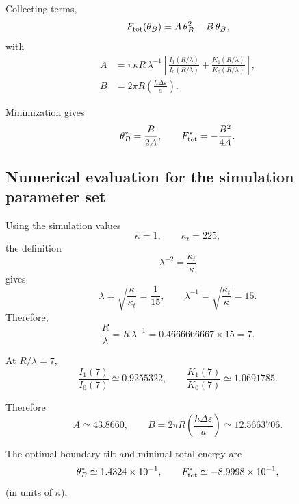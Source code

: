 \documentclass[11pt]{article}
\begin{document}
Collecting terms,
\begin{equation}
F_{\rm tot}(\theta_B)=A\,\theta_B^2 - B\,\theta_B,
\end{equation}
with
\begin{align}
A &= \pi\kappa R\,\lambda^{-1}
\left[
\frac{I_1(R/\lambda)}{I_0(R/\lambda)}
+
\frac{K_1(R/\lambda)}{K_0(R/\lambda)}
\right],
\\
B &= 2\pi R\left(\frac{h\Delta\varepsilon}{a}\right).
\end{align}

Minimization gives
\begin{equation}
\theta_B^\ast=\frac{B}{2A},
\qquad
F_{\rm tot}^\ast=-\frac{B^2}{4A}.
\end{equation}

\subsection{Numerical evaluation for the simulation parameter set}

Using the simulation values
\begin{equation}
\kappa = 1, \qquad
\kappa_t = 225,
\end{equation}
the definition
\begin{equation}
\lambda^{-2} = \frac{\kappa_t}{\kappa}
\end{equation}
gives
\begin{equation}
\lambda = \sqrt{\frac{\kappa}{\kappa_t}} = \frac{1}{15},
\qquad
\lambda^{-1} = \sqrt{\frac{\kappa_t}{\kappa}} = 15.
\end{equation}
Therefore,
\begin{equation}
\frac{R}{\lambda} = R\,\lambda^{-1}
= 0.4666666667 \times 15 = 7.
\end{equation}

At $R/\lambda = 7$,
\begin{equation}
\frac{I_1(7)}{I_0(7)} \simeq 0.9255322,
\qquad
\frac{K_1(7)}{K_0(7)} \simeq 1.0691785.
\end{equation}

Therefore
\begin{equation}
A \simeq 43.8660,
\qquad
B = 2\pi R\left(\frac{h\Delta\varepsilon}{a}\right)\simeq 12.5663706.
\end{equation}

The optimal boundary tilt and minimal total energy are
\begin{equation}
\theta_B^\ast \simeq 1.4324\times 10^{-1},
\qquad
F_{\rm tot}^\ast \simeq -8.9998\times 10^{-1},
\end{equation}
(in units of $\kappa$).
\end{document}
